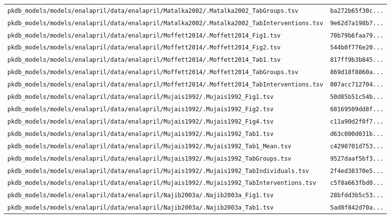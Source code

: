 \begin{longtable}{ll}
\texttt{pkdb\_models/models/enalapril/data/enalapril/Matalka2002/.Matalka2002\_TabGroups.tsv} & \texttt{ba272b65f30c...} \\
\texttt{pkdb\_models/models/enalapril/data/enalapril/Matalka2002/.Matalka2002\_TabInterventions.tsv} & \texttt{9e62d7a198b7...} \\
\texttt{pkdb\_models/models/enalapril/data/enalapril/Moffett2014/.Moffett2014\_Fig1.tsv} & \texttt{70b79b6faa79...} \\
\texttt{pkdb\_models/models/enalapril/data/enalapril/Moffett2014/.Moffett2014\_Fig2.tsv} & \texttt{544b0f776e20...} \\
\texttt{pkdb\_models/models/enalapril/data/enalapril/Moffett2014/.Moffett2014\_Tab1.tsv} & \texttt{817ff9b3b845...} \\
\texttt{pkdb\_models/models/enalapril/data/enalapril/Moffett2014/.Moffett2014\_TabGroups.tsv} & \texttt{869d18f8860a...} \\
\texttt{pkdb\_models/models/enalapril/data/enalapril/Moffett2014/.Moffett2014\_TabInterventions.tsv} & \texttt{007acc712704...} \\
\texttt{pkdb\_models/models/enalapril/data/enalapril/Mujais1992/.Mujais1992\_Fig1.tsv} & \texttt{50d85b51c54b...} \\
\texttt{pkdb\_models/models/enalapril/data/enalapril/Mujais1992/.Mujais1992\_Fig2.tsv} & \texttt{68169509dd8f...} \\
\texttt{pkdb\_models/models/enalapril/data/enalapril/Mujais1992/.Mujais1992\_Fig4.tsv} & \texttt{c11a90d2f0f7...} \\
\texttt{pkdb\_models/models/enalapril/data/enalapril/Mujais1992/.Mujais1992\_Tab1.tsv} & \texttt{d63c000d031b...} \\
\texttt{pkdb\_models/models/enalapril/data/enalapril/Mujais1992/.Mujais1992\_Tab1\_Mean.tsv} & \texttt{c4290701d753...} \\
\texttt{pkdb\_models/models/enalapril/data/enalapril/Mujais1992/.Mujais1992\_TabGroups.tsv} & \texttt{9527daaf5bf3...} \\
\texttt{pkdb\_models/models/enalapril/data/enalapril/Mujais1992/.Mujais1992\_TabIndividuals.tsv} & \texttt{2f4ed38370e5...} \\
\texttt{pkdb\_models/models/enalapril/data/enalapril/Mujais1992/.Mujais1992\_TabInterventions.tsv} & \texttt{c5f8a663fbd0...} \\
\texttt{pkdb\_models/models/enalapril/data/enalapril/Najib2003a/.Najib2003a\_Fig1.tsv} & \texttt{28bfdd3b5c53...} \\
\texttt{pkdb\_models/models/enalapril/data/enalapril/Najib2003a/.Najib2003a\_Tab1.tsv} & \texttt{5ad8f842d70a...} \\

\end{longtable}
